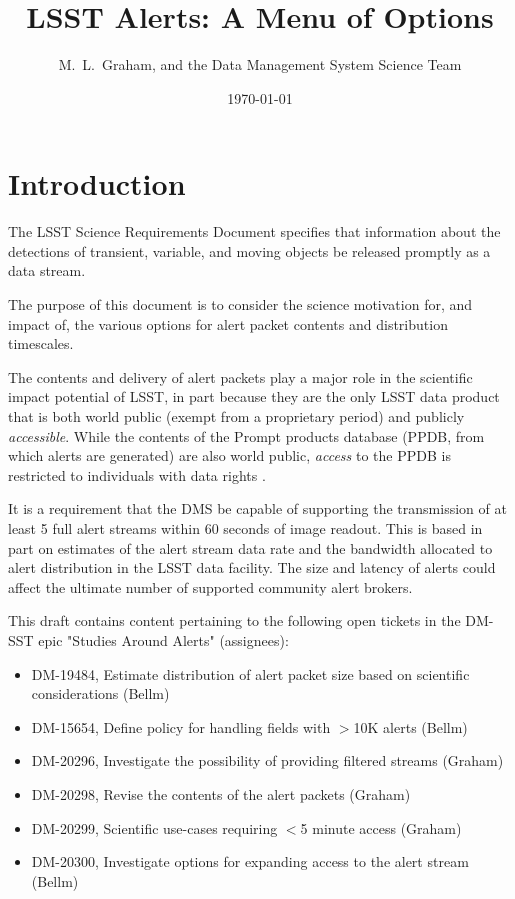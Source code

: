 \documentclass[DM,lsstdraft,authoryear,toc]{lsstdoc}
\title[Alerts Menu]{LSST Alerts: A Menu of Options}
\author{%
M.~L.~Graham, and the Data Management System Science Team
}
\date{\today}
\begin{document}
\maketitle

\section{Introduction} \label{sec:intro}

The LSST Science Requirements Document  specifies that information about the detections of transient, variable, and moving objects be released promptly as a data stream.

The purpose of this document is to consider the science motivation for, and impact of, the various options for alert packet contents and distribution timescales. 

The contents and delivery of alert packets play a major role in the scientific impact potential of LSST, in part because they are the only LSST data product that is both world public (exempt from a proprietary period) and publicly \emph{accessible}. While the contents of the Prompt products database (PPDB, from which alerts are generated) are also world public, \emph{access} to the PPDB is restricted to individuals with data rights .

It is a requirement that the DMS be capable of supporting the transmission of at least 5 full alert streams within 60 seconds of image readout. This is based in part on estimates of the alert stream data rate and the bandwidth allocated to alert distribution in the LSST data facility. The size and latency of alerts could affect the ultimate number of supported community alert brokers.

This draft contains content pertaining to the following open tickets in the DM-SST epic "Studies Around Alerts" (assignees):
\begin{itemize}
\item DM-19484, Estimate distribution of alert packet size based on scientific considerations (Bellm)
\item DM-15654, Define policy for handling fields with $>$10K alerts (Bellm)
\item DM-20296, Investigate the possibility of providing filtered streams (Graham)
\item DM-20298, Revise the contents of the alert packets (Graham)
\item DM-20299, Scientific use-cases requiring $<$5 minute access (Graham)
\item DM-20300, Investigate options for expanding access to the alert stream (Bellm)
\end{itemize}
\end{document}

